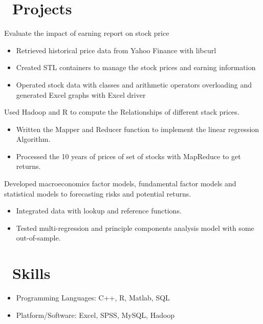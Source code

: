 \documentclass{resume}
\begin{document}
\section{\faCogs\ Projects}
Evaluate the impact of earning report on stock price
\begin{itemize}
  \item Retrieved historical price data from Yahoo Finance with libcurl
  \item Created STL containers to manage the stock prices and earning information
  \item Operated stock data with classes and arithmetic operators overloading and generated Excel graphs with Excel driver
\end{itemize}

Used Hadoop and R to compute the Relationships of different stack prices.
\begin{itemize}
  \item Written the Mapper and Reducer function to implement the linear regression Algorithm.
  \item Processed the 10 years of prices of set of stocks with MapReduce to get returns.
\end{itemize}

Developed macroeconomics factor models, fundamental factor models and statistical models to forecasting risks and potential returns.
\begin{itemize}
  \item Integrated data with lookup and reference functions.
  \item Tested multi-regression and principle components analysis model with some out-of-sample.
\end{itemize}

\section{\faCog\ Skills}
\begin{itemize}[parsep=0.5ex]
  \item Programming Languages: C++, R, Matlab, SQL 
  \item Platform/Software: Excel, SPSS, MySQL, Hadoop
\end{itemize}

\end{document}

